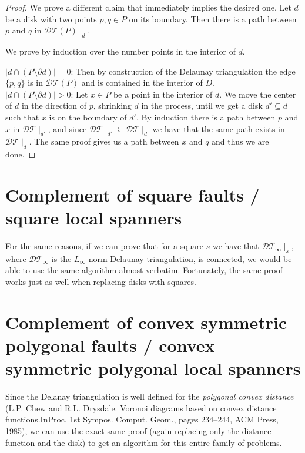 \documentclass{article}
\newcommand{\DT}{\mathcal{DT}}
\begin{document}
	\begin{proof}
		We prove a different claim that immediately implies the desired one. Let $d$ be a disk with two points $p,q\in P$ on its boundary. Then there is a path between $p$ and $q$ in $\DT(P)\mid_d$.
		
		We prove by induction over the number points in the interior of $d$.
		
		$|d\cap (P\setminus \partial d)| = 0$: Then by construction of the Delaunay triangulation the edge $\{p,q\}$ is in $\DT(P)$ and is contained in the interior of $D$.\\
		
		$|d\cap (P\setminus \partial d)| > 0$: Let $x\in P$ be a point in the interior of $d$. We move the center of $d$ in the direction of $p$, shrinking $d$ in the process, until we get a disk $d'\subseteq d$ such that $x$ is on the boundary of $d'$. By induction there is a path between $p$ and $x$ in $\DT\mid_{d'}$, and since $\DT\mid_{d'}\subseteq \DT\mid_{d}$ we have that the same path exists in $\DT\mid_{d}$. The same proof gives us a path between $x$ and $q$ and thus we are done.
		
	\end{proof}

	\section{Complement of square faults / square local spanners}
	
	For the same reasons, if we can prove that for a square $s$ we have that $\DT_\infty\mid_s$, where $\DT_\infty$ is the $L_{\infty}$ norm Delaunay triangulation, is connected, we would be able to use the same algorithm almost verbatim. Fortunately, the same proof works just as well when replacing disks with squares.
	
	
	\section{Complement of convex symmetric polygonal faults / convex symmetric polygonal local spanners}
	
	Since the Delanay triangulation is well defined for the \emph{polygonal convex distance} (L.P. Chew and R.L. Drysdale. Voronoi diagrams based on convex distance functions.InProc. 1st Sympos. Comput. Geom., pages 234–244, ACM Press, 1985), we can use the exact same proof (again replacing only the distance function and the disk) to get an algorithm for this entire family of problems.
	
\end{document}
